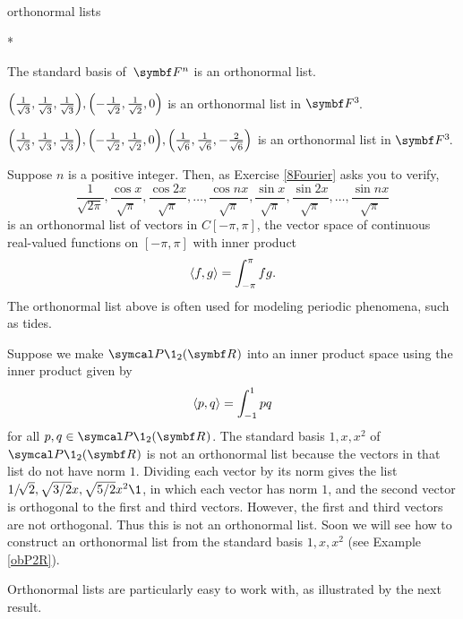 \begin{example}{orthonormal lists}
\begin{subtheorem}*
\item
The standard basis of~$\F{n}$ is an orthonormal list.

\item
$\paren[\Big]{ \frac{1}{\sqrt{3}}, \frac{1}{\sqrt{3}}, \frac{1}{\sqrt{3}} },
\paren[\Big]{ -\frac{1}{\sqrt{2}}, \frac{1}{\sqrt{2}}, 0 } $ is an orthonormal list in $\FF3$.

\item
$\paren[\Big]{ \frac{1}{\sqrt{3}}, \frac{1}{\sqrt{3}}, \frac{1}{\sqrt{3}} },
\paren[\Big]{ -\frac{1}{\sqrt{2}}, \frac{1}{\sqrt{2}}, 0 },
\paren[\Big]{\frac{1}{\sqrt{6}}, \frac{1}{\sqrt{6}}, -\frac{2}{\sqrt{6}} } $ is an orthonormal list in $\FF3$.

\item
Suppose $n$ is a positive integer.  Then, as Exercise \ref{8Fourier} asks you to verify,
\[
\frac{1}{\sqrt{2\pi}}, \frac{\cos x}{\sqrt{\pi}}, \frac{\cos 2x}{\sqrt{\pi}}, \dots,
\frac{\cos nx}{\sqrt{\pi}}, \frac{\sin x}{\sqrt{\pi}}, \frac{\sin 2x}{\sqrt{\pi}}, \dots,
\frac{\sin nx}{\sqrt{\pi}}
\]
is an orthonormal list of vectors in $C[-\pi,\pi]$, the vector space of
continuous real-valued functions on $[-\pi,\pi]$ with inner product
\[
\langle f, g\rangle = \int_{-\pi}^{\pi} fg.
\]
The orthonormal list above is often used for modeling periodic phenomena, such as tides.

\item
Suppose we make $\P\1_2(\R{})$ into an inner product space using the inner product given by
\[
\langle p, q\rangle = \int_{-1}^{1} pq
\]
for all $p, q \in \P\1_2(\R{})$. The standard basis $1, x, x^2$ of $\P\1_2(\R{})$ is not an orthonormal list because the vectors in that list do not have norm $1$. Dividing each vector by its norm gives the list $1/\!\sqrt{2}, \sqrt{3/2} x, \sqrt{5/2}x^2\1$, in which each vector has norm $1$, and the second vector is orthogonal to the first and third vectors. However, the first and third vectors are not orthogonal. Thus this is not an orthonormal list. Soon we will see how to construct an orthonormal list from the standard basis
$1, x, x^2$ (see Example \ref{obP2R}).
\end{subtheorem}
\exampleitemend
\end{example}

\pagebreak[3]

Orthonormal lists are particularly easy to work with, as illustrated by the next result.

